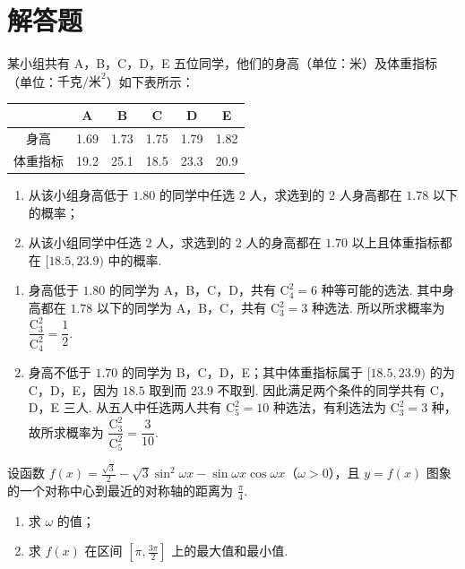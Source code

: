 \section{解答题}

\begin{problem}
某小组共有 A，B，C，D，E 五位同学，他们的身高（单位：\(\text{米}\)）及体重指标（单位：\(\text{千克}/\text{米}^{2}\)）如下表所示：

\begin{center}
\begin{tabular}{|c|c|c|c|c|c|}
\hline
 & A & B & C & D & E \\
\hline
身高 & 1.69 & 1.73 & 1.75 & 1.79 & 1.82 \\
\hline
体重指标 & 19.2 & 25.1 & 18.5 & 23.3 & 20.9 \\
\hline
\end{tabular}
\end{center}

\begin{enumerate}
\item 从该小组身高低于 \(1.80\) 的同学中任选 \(2\) 人，求选到的 \(2\) 人身高都在 \(1.78\) 以下的概率；
\item 从该小组同学中任选 \(2\) 人，求选到的 \(2\) 人的身高都在 \(1.70\) 以上且体重指标都在 \([18.5, 23.9)\) 中的概率.
\end{enumerate}
\end{problem}

\begin{solution}
\begin{enumerate}
\item 身高低于 \(1.80\) 的同学为 A，B，C，D，共有 \(\mathrm C_4^2=6\) 种等可能的选法. 其中身高都在 \(1.78\) 以下的同学为 A，B，C，共有 \(\mathrm C_3^2=3\) 种选法. 所以所求概率为 \(\dfrac{\mathrm C_3^2}{\mathrm C_4^2}=\dfrac{1}{2}\).
\item 身高不低于 \(1.70\) 的同学为 B，C，D，E；其中体重指标属于 \([18.5,23.9)\) 的为 C，D，E，因为 \(18.5\) 取到而 \(23.9\) 不取到. 因此满足两个条件的同学共有 C，D，E 三人. 从五人中任选两人共有 \(\mathrm C_5^2=10\) 种选法，有利选法为 \(\mathrm C_3^2=3\) 种，故所求概率为 \(\dfrac{\mathrm C_3^2}{\mathrm C_5^2}=\dfrac{3}{10}\).
\end{enumerate}
\end{solution}

\begin{problem}
设函数 \(f(x) = \frac{\sqrt{3}}{2} - \sqrt{3}\sin^2\omega x - \sin \omega x\cos \omega x \)（\(\omega > 0\)），且 \( y = f(x) \) 图象的一个对称中心到最近的对称轴的距离为 \( \frac{\pi}{4} \).

\begin{enumerate}
\item 求 \(\omega\) 的值；
\item 求 \( f(x) \) 在区间 \( \left[\pi, \frac{3\pi}{2}\right] \) 上的最大值和最小值.
\end{enumerate}
\end{problem}

